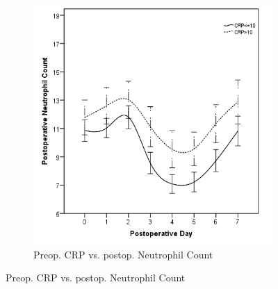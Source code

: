 \begin{figure}[p]
	\vspace{1cm}
	
	\begin{subfigure}{0.48\textwidth}
		\centering
		\includegraphics[width=\textwidth]{Figures/sirs_crp_neut}
		\caption{Preop. CRP vs. postop. Neutrophil Count}
		\label{fig:sirs_crp_neut}
	\end{subfigure}	
\end{figure}

